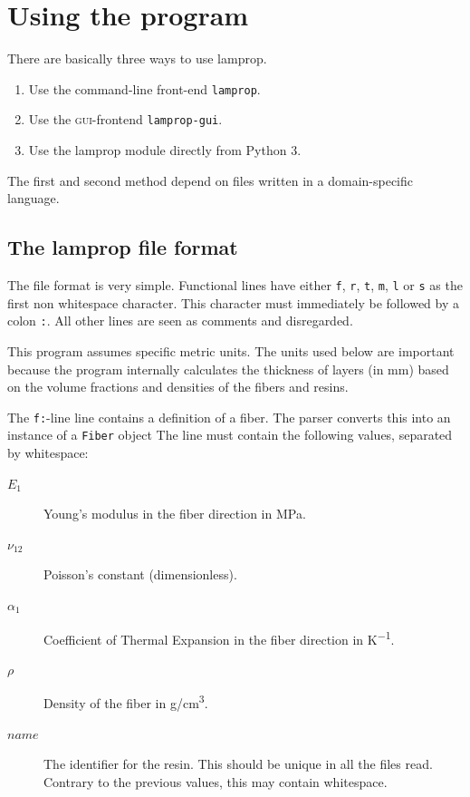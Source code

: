 \documentclass[a4paper,landscape,oneside,11pt,twocolumn]{memoir}
\begin{document}
\chapter{Using the program} %

There are basically three ways to use lamprop.

\begin{enumerate}
    \item Use the command-line front-end \texttt{lamprop}.
    \item Use the \textsc{gui}-frontend \texttt{lamprop-gui}.
    \item Use the lamprop module directly from Python 3.
\end{enumerate}

The first and second method depend on files written in a domain-specific
language.

\section{The lamprop file format} %

The file format is very simple. Functional lines have either \texttt{f},
\texttt{r}, \texttt{t}, \texttt{m}, \texttt{l} or \texttt{s} as the first
non whitespace character. This character must immediately be followed by
a colon \texttt{:}. All other lines are seen as comments and disregarded.

This program assumes specific metric units. The units used below are important
because the program internally calculates the thickness of layers (in mm)
based on the volume fractions and densities of the fibers and resins.

The \texttt{f:}-line line contains a definition of a fiber. The parser
converts this into an instance of a \texttt{Fiber} object The line must
contain the following values, separated by whitespace:
\begin{description}
    \item[$E_1$] Young's modulus in the fiber direction in \si{MPa}.
    \item[$\nu_{12}$] Poisson's constant (dimensionless).
    \item[$\alpha_1$] Coefficient of Thermal Expansion in the fiber direction
        in \si{K^{-1}}.
    \item[$\rho$] Density of the fiber in \si{g/cm^3}.
    \item[$name$] The identifier for the resin. This should be unique in all
        the files read. Contrary to the previous values, this may contain
        whitespace.
\end{description}
\end{document}
